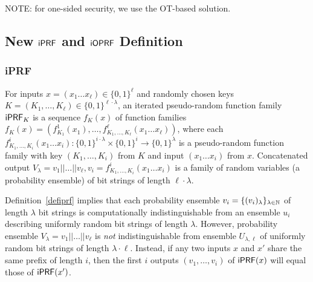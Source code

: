 NOTE: for one-sided security, we use the OT-based solution.

\subsection{New $\iprf$ and $\mathsf{i}\mathsf{OPRF}$ Definition}

\subsubsection{iPRF}
\begin{definition}[$\iprf$]\label{defiprf}
  For inputs $x=(x_1\ldots{}x_\ell)\in\{0,1\}^\ell$ and randomly
  chosen keys $K=(K_1,\ldots,K_\ell)\in\{0,1\}^{\ell\cdot\lambda}$, an
  iterated pseudo-random function family $\mathsf{i}\mathsf{PRF}_K$ is a sequence
  $f_K(x)$ of function families
  $f_K(x)=(f^1_{K_1}(x_{1}),\ldots,f^\ell_{K_1,\ldots,K_\ell}(x_{1}\ldots{}x_{\ell}))$,
  where each
  $f^i_{K_1,\ldots,K_i}(x_{1}\ldots{}x_{i}):\{0,1\}^{i\cdot\lambda}\times\{0,1\}^{i}\rightarrow{}\{0,1\}^\lambda$
  is a pseudo-random function family with key $(K_1,\ldots,K_i)$ from
  $K$ and input $(x_1\ldots{}x_i)$ from $x$. Concatenated output
  $V_\lambda=v_1||\ldots||v_\ell,v_i=f^i_{K_1,\ldots,K_i}(x_1\ldots{}x_i)$
  is a family of random variables (a probability ensemble) of bit
  strings of length $\ell\cdot\lambda$.

\end{definition}

Definition~\ref{defiprf} implies that each probability ensemble
$v_i=\{(v_i)_\lambda\}_{\lambda\in{\mathbb{N}}}$ of length $\lambda$ bit strings
is computationally indistinguishable from an ensemble $u_i$ describing
uniformly random bit strings of length $\lambda$. However, probability
ensemble $V_\lambda=v_1||\ldots||v_\ell$ is \emph{not}
indistinguishable from ensemble $U_{\lambda,\ell}$ of uniformly random
bit strings of length $\lambda\cdot\ell$. Instead, if any two inputs
$x$ and $x'$ share the same prefix of length $i$, then the first $i$
outputs $(v_1,\ldots,v_i)$ of $\mathsf{i}\mathsf{PRF}(x)$ will equal those of
$\mathsf{i}\mathsf{PRF}(x')$.  

